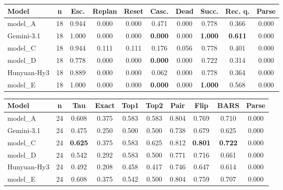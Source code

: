 \begin{center}
\label{tab:appendix_circuit_p3}
\scriptsize
\setlength{\tabcolsep}{3.5pt}
\renewcommand{\arraystretch}{1.08}
\begin{tabular}{lccccccccc}
\toprule
Model & n & Esc. & Replan & Reset & Casc. & Dead & Succ. & Rec. q. & Parse \\
\midrule
model_A & 18 & 0.944 & 0.000 & 0.000 & 0.471 & 0.000 & 0.778 & 0.366 & 0.000 \\
Gemini-3.1 & 18 & 1.000 & 0.000 & 0.000 & \textbf{0.000} & 0.000 & \textbf{1.000} & \textbf{0.611} & 0.000 \\
model_C & 18 & 0.944 & 0.111 & 0.111 & 0.176 & 0.056 & 0.778 & 0.401 & 0.000 \\
model_D & 18 & 0.778 & 0.000 & 0.000 & \textbf{0.000} & 0.000 & 0.722 & 0.314 & 0.000 \\
Hunyuan-Hy3 & 18 & 0.889 & 0.000 & 0.000 & 0.062 & 0.000 & 0.778 & 0.364 & 0.000 \\
model_E & 18 & 1.000 & 0.000 & 0.000 & \textbf{0.000} & 0.000 & \textbf{1.000} & 0.568 & 0.000 \\
\bottomrule
\end{tabular}
\end{center}

\begin{center}
\label{tab:appendix_circuit_p4}
\scriptsize
\setlength{\tabcolsep}{3.5pt}
\renewcommand{\arraystretch}{1.08}
\begin{tabular}{lccccccccc}
\toprule
Model & n & Tau & Exact & Top1 & Top2 & Pair & Flip & BARS & Parse \\
\midrule
model_A & 24 & 0.608 & 0.375 & 0.583 & 0.583 & 0.804 & 0.769 & 0.710 & 0.000 \\
Gemini-3.1 & 24 & 0.475 & 0.250 & 0.500 & 0.500 & 0.738 & 0.679 & 0.625 & 0.000 \\
model_C & 24 & \textbf{0.625} & 0.375 & 0.583 & 0.625 & 0.812 & \textbf{0.801} & \textbf{0.722} & 0.000 \\
model_D & 24 & 0.542 & 0.292 & 0.583 & 0.500 & 0.771 & 0.716 & 0.661 & 0.000 \\
Hunyuan-Hy3 & 24 & 0.492 & 0.208 & 0.458 & 0.417 & 0.746 & 0.647 & 0.614 & 0.000 \\
model_E & 24 & 0.608 & 0.375 & 0.542 & 0.500 & 0.804 & 0.759 & 0.707 & 0.000 \\
\bottomrule
\end{tabular}
\end{center}

